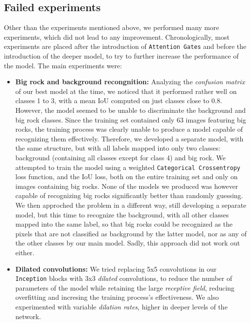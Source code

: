 \documentclass[11pt]{article}
\begin{document}
\begin{multicols}{2}
      \section{Failed experiments}
      \label{sec:failed_experiments}
      Other than the experiments mentioned above, we performed many more experiments, which did not lead to any improvement. Chronologically, most experiments are placed after the introduction of \texttt{Attention Gates} and before the introduction of the deeper model, to try to further increase the performance of the model. The main experiments were:
      \begin{itemize}[leftmargin=*]
            \item \textbf{Big rock and background recongnition:} Analyzing the \textit{confusion matrix} of our best model at the time, we noticed that it performed rather well on classes 1 to 3, with a mean IoU computed on just classes close to $0.8$. However, the model seemed to be unable to discriminate the background and big rock classes. Since the training set contained only $63$ images featuring big rocks, the training process was clearly unable to produce a model capable of recognizing them effectively. Therefore, we developed a separate model, with the same structure, but with all labels mapped into only two classes: background (containing all classes except for class 4) and big rock. We attempted to train the model using a weighted \texttt{Categorical Crossentropy} loss function, and the IoU loss, both on the entire training set and only on images containing big rocks. None of the models we produced was however capable of recognizing big rocks significantly better than randomly guessing. We then approched the problem in a different way, still developing a separate model, but this time to recognize the background, with all other classes mapped into the same label, so that big rocks could be recognized as the pixels that are not classified as background by the latter model, nor as any of the other classes by our main model. Sadly, this approach did not work out either.
            \item \textbf{Dilated convolutions:} We tried replacing 5x5 convolutions in our \texttt{Inception} blocks with 3x3 \textit{dilated} convolutions, to reduce the number of parameters of the model while retaining the large \textit{receptive field}, reducing overfitting and incresing the training process's effectiveness. We also experimented with variable \textit{dilation rates}, higher in deeper levels of the network.

\end{itemize}
\end{multicols}
\end{document}
